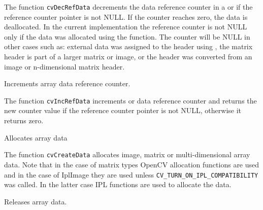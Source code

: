 The function \texttt{cvDecRefData} decrements the data reference counter in a  or
 if the reference counter pointer
is not NULL. If the counter reaches zero, the data is deallocated. In the
current implementation the reference counter is not NULL only if the data
was allocated using the  function. The counter will be NULL in other cases such as:
external data was assigned to the header using , the matrix
header is part of a larger matrix or image, or the header was converted from an image or n-dimensional matrix header. 



\label{IncRefData}

Increments array data reference counter.


\begin{description}
\end{description}


The function \texttt{cvIncRefData} increments  or
 data reference counter and returns the new counter value
if the reference counter pointer is not NULL, otherwise it returns zero.
\fi

\label{CreateData}

Allocates array data


\begin{description}
\end{description}


The function \texttt{cvCreateData} allocates image, matrix or
multi-dimensional array data. Note that in the case of matrix types OpenCV
allocation functions are used and in the case of IplImage they are used
unless \texttt{CV\_TURN\_ON\_IPL\_COMPATIBILITY} was called. In the
latter case IPL functions are used to allocate the data.

\ifC

\label{ReleaseData}

Releases array data.


